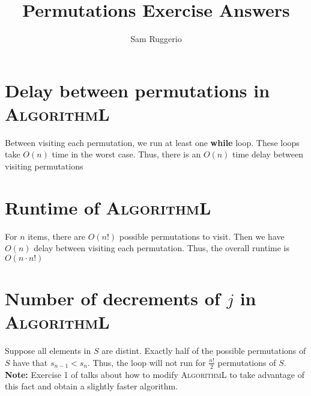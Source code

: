 \documentclass[letterpaper]{article}
\title{Permutations Exercise Answers}
\author{Sam Ruggerio}
\begin{document}
\maketitle

\section*{Delay between permutations in \textsc{AlgorithmL}}

Between visiting each permutation, we run at least one \textbf{while} loop.
These loops take $O(n)$ time in the worst case.
Thus, there is an $O(n)$ time delay between visiting permutations

\section*{Runtime of \textsc{AlgorithmL}}

For $n$ items, there are $O(n!)$ possible permutations to visit.
Then we have $O(n)$ delay between visiting each permutation.
Thus, the overall runtime is $O(n \cdot n!)$

\section*{Number of decrements of {\boldmath $j$} in \textsc{AlgorithmL}}

Suppose all elements in $S$ are distint.
Exactly half of the possible permutations of $S$ have that $s_{n - 1} < s_{n}$.
Thus, the loop will not run for $\frac{n!}{2}$ permutations of $S$.
\textbf{Note:} Exercise 1 of \cite[Chapter~7.2.1.2]{TAOCP4A} talks about how to modify \textsc{AlgorithmL} to take advantage of this fact and obtain a slightly faster algorithm.

\printbibliography
\end{document}
